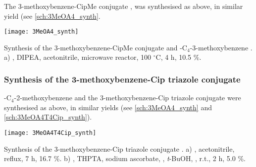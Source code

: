 The 3-methoxybenzene-CipMe conjugate , 
was synthesised as above, in similar yield (see \ref{sch:3MeOA4_synth}.

\begin{scheme}[H]
	\begin{center}
		\texttt{[image: 3MeOA4\_synth]}
		\caption{Synthesis of the 3-methoxybenzene-CipMe conjugate  and -C$_4$-3-methoxybenzene . 
				a)  , DIPEA, acetonitrile, microwave reactor, 100 $^{\circ}$C, 4 h, 10.5 \%.
				\label{sch:3MeOA4_synth}}
	\end{center}
\end{scheme}

\subsubsection{Synthesis of the 3-methoxybenzene-Cip triazole conjugate }

-C$_4$-2-methoxybenzene  
and the 3-methoxybenzene-Cip triazole conjugate  were synthesised as above, in similar yields (see \ref{sch:3MeOA4_synth} and \ref{sch:3MeOA4T4Cip_synth}).

\begin{scheme}[H]
	\begin{center}
				\texttt{[image: 3MeOA4T4Cip\_synth]}
		\caption{Synthesis of the 3-methoxybenzene-Cip triazole conjugate . 
		a) , acetonitrile, reflux, 7 h, 16.7 \%. 
		b) , THPTA, sodium ascorbate, , \textit{t}-BuOH, , r.t., 2 h, 5.0 \%. 
		\label{sch:3MeOA4T4Cip_synth}}
	\end{center}
\end{scheme}

